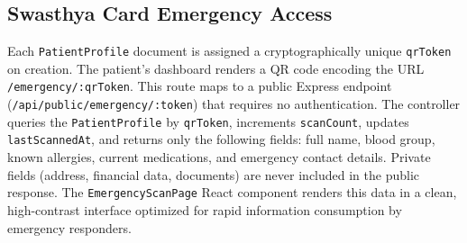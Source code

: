 \subsection{Swasthya Card Emergency Access}

Each \texttt{PatientProfile} document is assigned a cryptographically unique \texttt{qrToken} on creation. The patient's dashboard renders a QR code encoding the URL \texttt{/emergency/:qrToken}. This route maps to a public Express endpoint (\texttt{/api/public/emergency/:token}) that requires no authentication. The controller queries the \texttt{PatientProfile} by \texttt{qrToken}, increments \texttt{scanCount}, updates \texttt{lastScannedAt}, and returns only the following fields: full name, blood group, known allergies, current medications, and emergency contact details. Private fields (address, financial data, documents) are never included in the public response. The \texttt{EmergencyScanPage} React component renders this data in a clean, high-contrast interface optimized for rapid information consumption by emergency responders.


